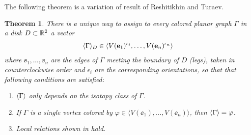 \documentclass{amsart}
\newtheorem{thm}{Theorem}[section]
\newcommand{\Ga}{\Gamma}
\newcommand{\ph}{\varphi}
\begin{document}
The following theorem is a variation of result of Reshitikhin and Turaev. 
\begin{thm}\label{t:RT}
  There is a unique  way to assign to every colored
  planar graph $\Ga$ in a disk $D\subset \mathbb{R}^2$ a vector
  \begin{equation*}
    \<\Ga\>_D\in \langle V(\ee_1)^{\epsilon_i}, \dots, V(\ee_n)^{\epsilon_n} \rangle
  \end{equation*}
  where $\ee_1,\dots, \ee_n$ are the edges of $\Ga$ meeting the boundary
  of $D$ (legs), taken in counterclockwise order and $\epsilon_i$ are the corresponding orientations,
  so that that following conditions are satisfied:
  \begin{enumerate}
     \item $\<\Ga\>$ only depends on the isotopy  class of $\Ga$.

    \item If $\Ga$ is a single vertex colored by
          $\ph\in \langle V(\ee_1), \dots,  V(\ee_n)\rangle$, then $\<\Ga\>=\ph$.
     
    \item Local relations shown in  hold.



\end{enumerate}
\end{thm}
\end{document}
